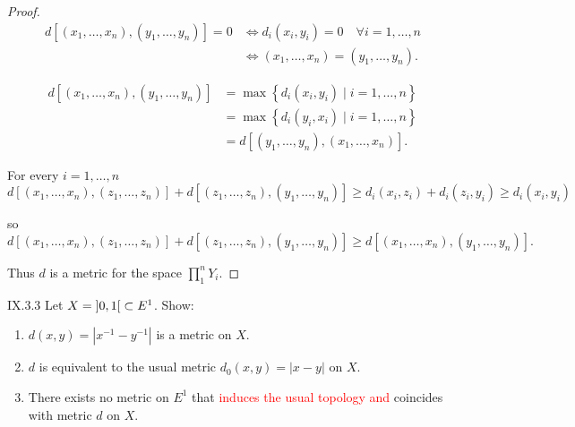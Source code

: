 \begin{proof}
	\begingroup
	\allowdisplaybreaks%
	\begin{align*}
		d[(x_{1}, \ldots, x_{n}), (y_{1}, \ldots, y_{n})] = 0 & \iff d_{i}(x_{i}, y_{i}) = 0 \quad \forall i = 1, \ldots, n \\
		                                                      & \iff (x_{1}, \ldots, x_{n}) = (y_{1}, \ldots, y_{n}).
	\end{align*}
	\endgroup

	\begingroup
	\allowdisplaybreaks%
	\begin{align*}
		d[(x_{1}, \ldots, x_{n}), (y_{1}, \ldots, y_{n})] & = \max\left\{ d_{i}(x_{i}, y_{i}) \mid i = 1, \ldots, n \right\} \\
		                                                  & = \max\left\{ d_{i}(y_{i}, x_{i}) \mid i = 1, \ldots, n \right\} \\
		                                                  & = d[(y_{1}, \ldots, y_{n}), (x_{1}, \ldots, x_{n})].
	\end{align*}
	\endgroup

	For every \( i = 1, \ldots, n \)
	\[
		d[(x_{1}, \ldots, x_{n}), (z_{1}, \ldots, z_{n})] + d[(z_{1}, \ldots, z_{n}), (y_{1}, \ldots, y_{n})] \ge d_{i}(x_{i}, z_{i}) + d_{i}(z_{i}, y_{i}) \ge d_{i}(x_{i}, y_{i})
	\]

	so
	\[
		d[(x_{1}, \ldots, x_{n}), (z_{1}, \ldots, z_{n})] + d[(z_{1}, \ldots, z_{n}), (y_{1}, \ldots, y_{n})] \ge d[(x_{1}, \ldots, x_{n}), (y_{1}, \ldots, y_{n})].
	\]

	Thus \( d \) is a metric for the space \( \prod^{n}_{1} Y_{i} \).
\end{proof}

\begin{problem}{IX.3.3}
Let \( X = \left\rbrack{0, 1}\right\lbrack \subset E^{1} \). Show:
\begin{enumerate}[label={(\alph*)}]
	\item \( d(x, y) = \left\vert x^{-1} - y^{-1} \right\vert \) is a metric on \( X \).
	\item \( d \) is equivalent to the usual metric \( d_{0}(x, y) = \left\vert x - y \right\vert \) on \( X \).
	\item There exists no metric on \( E^{1} \) that \textcolor{red}{induces the usual topology and} coincides with metric \( d \) on \( X \).
\end{enumerate}
\end{problem}

